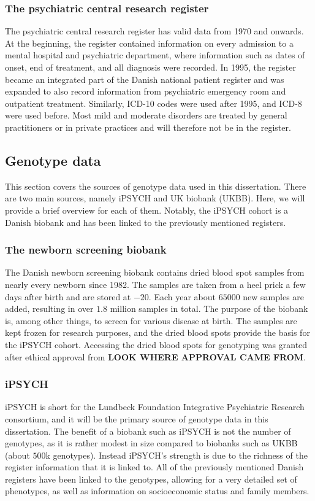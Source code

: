 \subsubsection{The psychiatric central research register}
The psychiatric central research register has valid data from 1970 and onwards. At the beginning, the register contained information on every admission to a mental hospital and psychiatric department, where information such as dates of onset, end of treatment, and all diagnosis were recorded. In 1995, the register became an integrated part of the Danish national patient register and was expanded to also record information from psychiatric emergency room and outpatient treatment. Similarly, ICD-10 codes were used after 1995, and ICD-8 were used before. Most mild and moderate disorders are treated by general practitioners or in private practices and will therefore not be in the register.\cite{mors2011danish}



\subsection{Genotype data}
This section covers the sources of genotype data used in this dissertation. There are two main sources, namely iPSYCH and UK biobank (UKBB). Here, we will provide a brief overview for each of them. Notably, the iPSYCH cohort is a Danish biobank and has been linked to the previously mentioned registers. 

\subsubsection{The newborn screening biobank}
The Danish newborn screening biobank contains dried blood spot samples from nearly every newborn since 1982. The samples are taken from a heel prick a few days after birth and are stored at $ -20 $\textcelsius. Each year about $ 65000 $ new samples are added, resulting in over $ 1.8 $ million samples in total. The purpose of the biobank is, among other things, to screen for various disease at birth. The samples are kept frozen for research purposes, and the dried blood spots provide the basis for the iPSYCH cohort. Accessing the dried blood spots for genotyping was granted after ethical approval from \textbf{LOOK WHERE APPROVAL CAME FROM}. \cite{norgaard2007storage}

\subsubsection{iPSYCH}
iPSYCH is short for the Lundbeck Foundation Integrative Psychiatric Research consortium, and it will be the primary source of genotype data in this dissertation. The benefit of a biobank such as iPSYCH is not the number of genotypes, as it is rather modest in size compared to biobanks such as UKBB (about $ 500 $k genotypes). Instead iPSYCH's strength is due to the richness of the register information that it is linked to. All of the previously mentioned Danish registers have been linked to the genotypes, allowing for a very detailed set of phenotypes, as well as information on socioeconomic status and family members.

